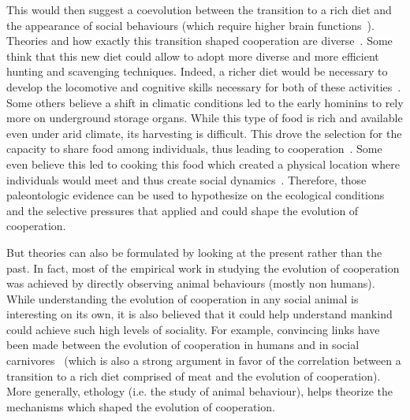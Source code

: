     This would then suggest a coevolution between the transition to a rich diet and the appearance of social behaviours (which require higher brain functions~\cite{Dunbar2007, Isler2012}). Theories and how exactly this transition shaped cooperation are diverse~\cite{Pontze2012}. Some think that this new diet could allow to adopt more diverse and more efficient hunting and scavenging techniques. Indeed, a richer diet would be necessary to develop the locomotive and cognitive skills necessary for both of these activities~\cite{Aiello1995, Bramble2004}. Some others believe a shift in climatic conditions led to the early hominins to rely more on underground storage organs. While this type of food is rich and available even under arid climate, its harvesting is difficult. This drove the selection for the capacity to share food among individuals, thus leading to cooperation~\cite{O'Connell2002}. Some even believe this led to cooking this food which created a physical location where individuals would meet and thus create social dynamics~\cite{Wrangham1999, Wrangham2009}. Therefore, those paleontologic evidence can be used to hypothesize on the ecological conditions and the selective pressures that applied and could shape the evolution of cooperation.

    But theories can also be formulated by looking at the present rather than the past. In fact, most of the empirical work in studying the evolution of cooperation was achieved by directly observing animal behaviours (mostly non humans). While understanding the evolution of cooperation in any social animal is interesting on its own, it is also believed that it could help understand mankind could achieve such high levels of sociality. For example, convincing links have been made between the evolution of cooperation in humans and in social carnivores~\cite{Schaller1968, Smith2012} (which is also a strong argument in favor of the correlation between a transition to a rich diet comprised of meat and the evolution of cooperation). More generally, ethology (i.e. the study of animal behaviour), helps theorize the mechanisms which shaped the evolution of cooperation.

